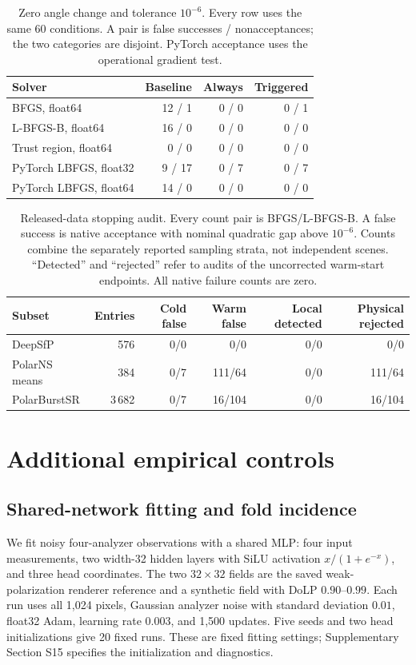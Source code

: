 \begin{table}[H]
\caption{Zero angle change and tolerance $10^{-6}$. Every row uses the same 60 conditions. A pair is false successes / nonacceptances; the two categories are disjoint. PyTorch acceptance uses the operational gradient test.}
\label{SI-tab:warm}
\centering\small
\begin{tabular}{@{}lrrr@{}}\toprule
Solver & Baseline & Always & Triggered\\\midrule
BFGS, float64 & 12 / 1 & 0 / 0 & 0 / 1\\
L-BFGS-B, float64 & 16 / 0 & 0 / 0 & 0 / 0\\
Trust region, float64 & 0 / 0 & 0 / 0 & 0 / 0\\
PyTorch LBFGS, float32 & 9 / 17 & 0 / 7 & 0 / 7\\
PyTorch LBFGS, float64 & 14 / 0 & 0 / 0 & 0 / 0\\\bottomrule
\end{tabular}
\end{table}

\begin{table}[H]
\caption{Released-data stopping audit. Every count pair is BFGS/L-BFGS-B. A false success is native acceptance with nominal quadratic gap above $10^{-6}$. Counts combine the separately reported sampling strata, not independent scenes. ``Detected'' and ``rejected'' refer to audits of the uncorrected warm-start endpoints. All native failure counts are zero.}
\label{SI-tab:realdata}
\centering\small\renewcommand{\arraystretch}{1.15}
\begin{tabularx}{\textwidth}{@{}Xrrrrr@{}}\toprule
Subset & Entries & Cold false & Warm false & Local detected & Physical rejected\\\midrule
DeepSfP & 576 & 0/0 & 0/0 & 0/0 & 0/0\\
PolarNS means & 384 & 0/7 & 111/64 & 0/0 & 111/64\\
PolarBurstSR & 3\,682 & 0/7 & 16/104 & 0/0 & 16/104\\\bottomrule
\end{tabularx}
\end{table}


\FloatBarrier
\section{Additional empirical controls}
\label{SI-sec:empiricalcontrols}
\subsection{Shared-network fitting and fold incidence}
We fit noisy four-analyzer observations with a shared MLP: four input measurements, two width-32 hidden layers with SiLU activation $x/(1+e^{-x})$, and three head coordinates. The two $32\times32$ fields are the saved weak-polarization renderer reference and a synthetic field with DoLP $0.90$--$0.99$. Each run uses all 1,024 pixels, Gaussian analyzer noise with standard deviation $0.01$, float32 Adam, learning rate $0.003$, and 1,500 updates. Five seeds and two head initializations give 20 fixed runs. These are fixed fitting settings; Supplementary Section S15 specifies the initialization and diagnostics.

